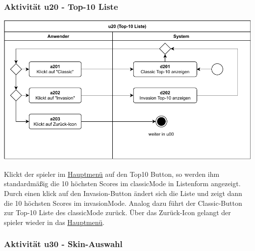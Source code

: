\subsubsection{Aktivität u20 - Top-10 Liste}

\vspace*{1cm}

\includegraphics[width=\linewidth]{diagramme/pdf/UML-Activity-u20.pdf}
\label{fig:dia:top10}
\vspace*{0.5cm}

Klickt der \gls{spieler} im \hyperref[fig:dia:mainMenu]{Hauptmenü} auf den \gls{Top10} Button, so werden ihm standardmäßig die 10 höchsten Scores im \gls{classicMode} in Listenform angezeigt. Durch einen klick auf den Invasion-Button ändert sich die Liste und zeigt dann die 10 höchsten Scores im \gls{invasionMode}. Analog dazu führt der Classic-Button zur Top-10 Liste des \gls{classicMode} zurück.
Über das Zurück-Icon gelangt der \gls{spieler} wieder in das \hyperref[fig:dia:mainMenu]{Hauptmenü}.

\clearpage

\subsubsection{Aktivität u30 - Skin-Auswahl}

\vspace*{1cm}

